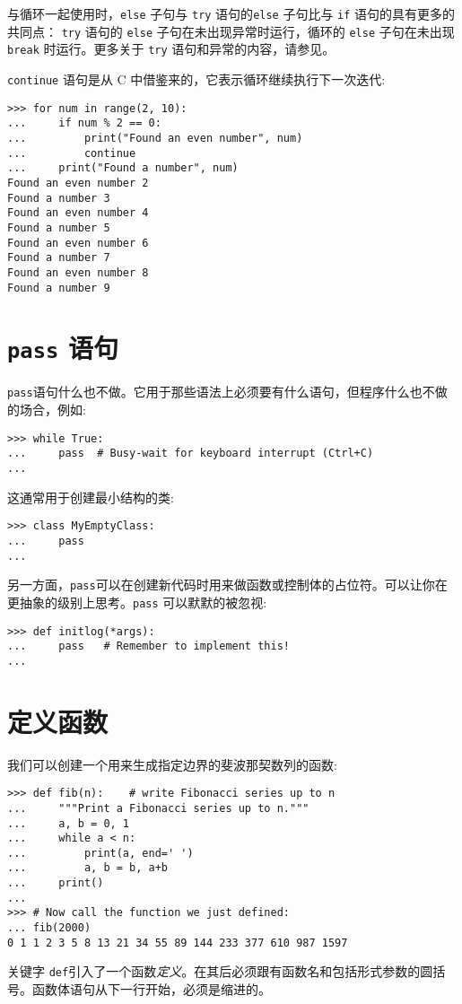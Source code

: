 与循环一起使用时，\texttt{else} 子句与 \texttt{try} 语句的\texttt{else} 子句比与 \texttt{if} 语句的具有更多的共同点： \texttt{try} 语句的 \texttt{else} 子句在未出现异常时运行，循环的 \texttt{else} 子句在未出现 \texttt{break} 时运行。更多关于 \texttt{try} 语句和异常的内容，请参见。

\texttt{continue} 语句是从 C 中借鉴来的，它表示循环继续执行下一次迭代:
\begin{lstlisting}
>>> for num in range(2, 10):
...     if num % 2 == 0:
...         print("Found an even number", num)
...         continue
...     print("Found a number", num)
Found an even number 2
Found a number 3
Found an even number 4
Found a number 5
Found an even number 6
Found a number 7
Found an even number 8
Found a number 9
\end{lstlisting}
\section{\texttt{pass} 语句}
\texttt{pass}语句什么也不做。它用于那些语法上必须要有什么语句，但程序什么也不做的场合，例如:
\begin{lstlisting}
>>> while True:
...     pass  # Busy-wait for keyboard interrupt (Ctrl+C)
...
\end{lstlisting}
这通常用于创建最小结构的类:
\begin{lstlisting}
>>> class MyEmptyClass:
...     pass
...
\end{lstlisting}
另一方面，\texttt{pass}可以在创建新代码时用来做函数或控制体的占位符。可以让你在更抽象的级别上思考。\texttt{pass} 可以默默的被忽视:
\begin{lstlisting}
>>> def initlog(*args):
...     pass   # Remember to implement this!
...
\end{lstlisting}
\section{定义函数}
我们可以创建一个用来生成指定边界的斐波那契数列的函数:
\begin{lstlisting}
>>> def fib(n):    # write Fibonacci series up to n
...     """Print a Fibonacci series up to n."""
...     a, b = 0, 1
...     while a < n:
...         print(a, end=' ')
...         a, b = b, a+b
...     print()
...
>>> # Now call the function we just defined:
... fib(2000)
0 1 1 2 3 5 8 13 21 34 55 89 144 233 377 610 987 1597
\end{lstlisting}

关键字 \texttt{def}引入了一个函数\emph{定义}。在其后必须跟有函数名和包括形式参数的圆括号。函数体语句从下一行开始，必须是缩进的。

